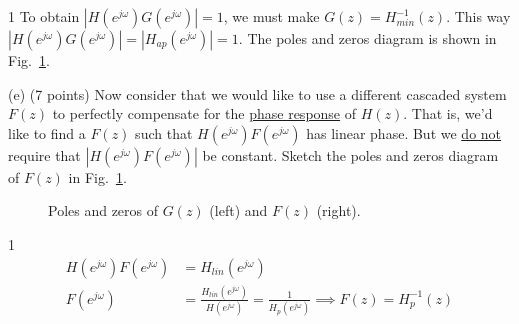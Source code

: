 \documentclass[10pt]{article}
\def\SOLUTIONS{0} %
\def\SolutionsColor{red2}
\begin{document}
\begin{description}
\if\SOLUTIONS1
{\color{\SolutionsColor}
	To obtain $|H(e^{j\omega})G(e^{j\omega})| = 1$, we must make $G(z) = H_{min}^{-1}(z)$. This way $|H(e^{j\omega})G(e^{j\omega})| = |H_{ap}(e^{j\omega})| = 1$. The poles and zeros diagram is shown in Fig.~\ref{fig:Hz-inverses}.
}
\else\vspace{1cm}
\fi
\item{(e)} (7 points) Now consider that we would like to use a different cascaded system $F(z)$ to perfectly compensate for the \underline{phase response} of $H(z)$. That is, we'd like to find a $F(z)$ such that $H(e^{j\omega})F(e^{j\omega})$ has linear phase. But we \underline{do not} require that $|H(e^{j\omega})F(e^{j\omega})|$ be constant. Sketch the poles and zeros diagram of $F(z)$ in Fig.~\ref{fig:Hz-inverses}.

\FloatBarrier
\begin{figure}[!h]
	\centering
	\resizebox{0.9\textwidth}{!}{}
	\caption{Poles and zeros of $G(z)$ (left) and $F(z)$ (right).} \label{fig:Hz-inverses}
\end{figure}
\FloatBarrier

\if\SOLUTIONS1
{\color{\SolutionsColor}
	\begin{align} \nonumber
	H(e^{j\omega})F(e^{j\omega}) &= H_{lin}(e^{j\omega}) \\ \nonumber
	F(e^{j\omega}) &= \frac{H_{lin}(e^{j\omega})}{H(e^{j\omega})} = \frac{1}{H_p(e^{j\omega})} \implies F(z) = H_p^{-1}(z)
	\end{align}
}
\else\vspace{1cm}
\fi
\end{description}
\end{document}

